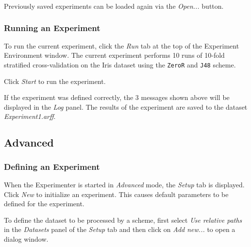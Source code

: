 Previously saved experiments can be loaded again via the \textit{Open...} button.


\subsubsection{Running an Experiment}

To run the current experiment, click the \textit{Run} tab at the top of the Experiment Environment window. The current experiment performs 10 runs of 10-fold stratified cross-validation on the Iris dataset using the \texttt{ZeroR} and \texttt{J48} scheme.

\begin{center}
\end{center}


Click \textit{Start} to run the experiment.

\begin{center}
\end{center}


If the experiment was defined correctly, the 3 messages shown above will be displayed in the \textit{Log} panel. The results of the experiment are saved to the dataset \textit{Experiment1.arff}. 


\newpage
\subsection{Advanced}

\subsubsection{Defining an Experiment}

When the Experimenter is started in \textit{Advanced} mode, the \textit{Setup} tab is displayed. Click \textit{New} to initialize an experiment. This causes default parameters to be defined for the experiment.
\begin{center}
\end{center}

To define the dataset to be processed by a scheme, first select \textit{Use relative paths} in the \textit{Datasets} panel of the \textit{Setup} tab and then click on \textit{Add new...} to open a dialog window.
\begin{center}
\end{center}

